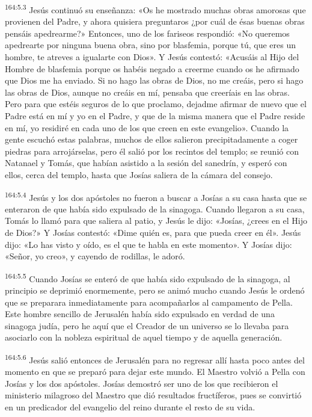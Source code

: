 \par 
\textsuperscript{164:5.3} Jesús continuó su enseñanza: «Os he mostrado muchas obras amorosas que provienen del Padre, y ahora quisiera preguntaros ¿por cuál de ésas buenas obras pensáis apedrearme?» Entonces, uno de los fariseos respondió: «No queremos apedrearte por ninguna buena obra, sino por blasfemia, porque tú, que eres un hombre, te atreves a igualarte con Dios». Y Jesús contestó: «Acusáis al Hijo del Hombre de blasfemia porque os habéis negado a creerme cuando os he afirmado que Dios me ha enviado. Si no hago las obras de Dios, no me creáis, pero si hago las obras de Dios, aunque no creáis en mí, pensaba que creeríais en las obras. Pero para que estéis seguros de lo que proclamo, dejadme afirmar de nuevo que el Padre está en mí y yo en el Padre, y que de la misma manera que el Padre reside en mí, yo residiré en cada uno de los que creen en este evangelio». Cuando la gente escuchó estas palabras, muchos de ellos salieron precipitadamente a coger piedras para arrojárselas, pero él salió por los recintos del templo; se reunió con Natanael y Tomás, que habían asistido a la sesión del sanedrín, y esperó con ellos, cerca del templo, hasta que Josías saliera de la cámara del consejo.

\par 
\textsuperscript{164:5.4} Jesús y los dos apóstoles no fueron a buscar a Josías a su casa hasta que se enteraron de que había sido expulsado de la sinagoga. Cuando llegaron a su casa, Tomás lo llamó para que saliera al patio, y Jesús le dijo: «Josías, ¿crees en el Hijo de Dios?» Y Josías contestó: «Dime quién es, para que pueda creer en él». Jesús dijo: «Lo has visto y oído, es el que te habla en este momento». Y Josías dijo: «Señor, yo creo», y cayendo de rodillas, le adoró.

\par 
\textsuperscript{164:5.5} Cuando Josías se enteró de que había sido expulsado de la sinagoga, al principio se deprimió enormemente, pero se animó mucho cuando Jesús le ordenó que se preparara inmediatamente para acompañarlos al campamento de Pella. Este hombre sencillo de Jerusalén había sido expulsado en verdad de una sinagoga judía, pero he aquí que el Creador de un universo se lo llevaba para asociarlo con la nobleza espiritual de aquel tiempo y de aquella generación.

\par 
\textsuperscript{164:5.6} Jesús salió entonces de Jerusalén para no regresar allí hasta poco antes del momento en que se preparó para dejar este mundo. El Maestro volvió a Pella con Josías y los dos apóstoles. Josías demostró ser uno de los que recibieron el ministerio milagroso del Maestro que dió resultados fructíferos, pues se convirtió en un predicador del evangelio del reino durante el resto de su vida.